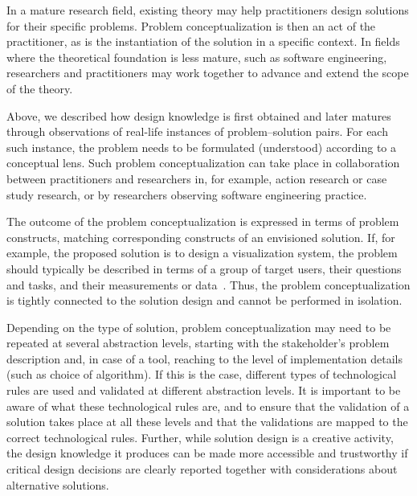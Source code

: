 \documentclass[graybox]{svmult}
\begin{document}
In a mature research field, existing theory may help practitioners design solutions for their specific problems. Problem conceptualization is then an act of the practitioner, as is the instantiation of the solution in a specific context. In fields where the theoretical foundation is less mature, such as software engineering, researchers and practitioners may work together to advance and extend the scope of the theory. 

 Above, we described how design knowledge is first obtained and later matures through observations of real-life instances of problem--solution pairs. For each such instance, the problem needs to be formulated (understood) according to a conceptual lens. Such problem conceptualization can take place in collaboration between practitioners and researchers in, for example, action research or case study research, or by researchers observing software engineering practice.


The outcome of the problem conceptualization is expressed in terms of problem constructs, matching corresponding constructs of an envisioned solution. If, for example, the proposed solution is to design a visualization system, the problem should typically be described in terms of a group of target users, their questions and tasks, and their measurements or data~\citep{meyer_nested_2015}. Thus, the problem conceptualization is tightly connected to the solution design and cannot be performed in isolation. 



Depending on the type of solution, problem conceptualization may need to be repeated at several abstraction levels, starting with the stakeholder's problem description and, in case of a tool, reaching to the level of implementation details (such as choice of algorithm). If this is the case, different types of technological rules are used and validated at different abstraction levels. It is important to be aware of what these technological rules are, and to ensure that the validation of a solution takes place at all these levels and that the validations are mapped to the correct technological rules. Further, while solution design is a creative activity, the design knowledge it produces can be made more accessible and trustworthy if critical design decisions are clearly reported together with considerations about alternative solutions.
\end{document}
